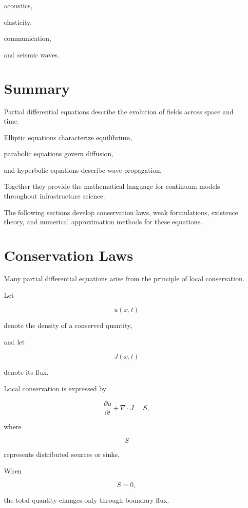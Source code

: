\documentclass[11pt,fleqn]{book}
\numberwithin{equation}{chapter}
\theoremstyle{plain}
\theoremstyle{definition}
\theoremstyle{remark}
\begin{document}
acoustics,

elasticity,

communication,

and seismic waves.


\section{Summary}

Partial differential equations describe the evolution of fields across
space and time.

Elliptic equations characterize equilibrium,

parabolic equations govern diffusion,

and hyperbolic equations describe wave propagation.

Together they provide the mathematical language for continuum models
throughout infrastructure science.

The following sections develop conservation laws, weak formulations,
existence theory, and numerical approximation methods for these
equations.


\section{Conservation Laws}

Many partial differential equations arise from the principle of local
conservation.

Let

\[
u(x,t)
\]

denote the density of a conserved quantity,

and let

\[
J(x,t)
\]

denote its flux.

Local conservation is expressed by

\[
\boxed{
\frac{\partial u}{\partial t}
+
\nabla\cdot J
=
S,
}
\]

where

\[
S
\]

represents distributed sources or sinks.

When

\[
S=0,
\]

the total quantity changes only through boundary flux.
\end{document}
